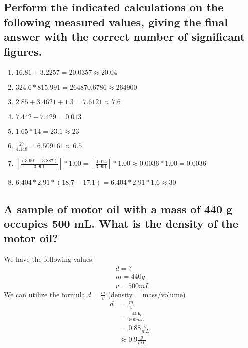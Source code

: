 \documentclass[11pt]{article}
\begin{document}
\subsection{Perform the indicated calculations on the following measured values, giving the final answer with the correct number of significant figures.}
\label{sec:org532b66f}
\begin{enumerate}
\item \(16.81 + 3.2257 = 20.0357 \approx 20.04\)
\item \(324.6 * 815.991 = 264870.6786 \approx 264900\)
\item \(2.85 + 3.4621 + 1.3 = 7.6121 \approx 7.6\)
\item \(7.442 - 7.429 = 0.013\)
\item \(1.65 * 14 = 23.1 \approx 23\)
\item \(\frac{27}{4.148} = 6.509161 \approx 6.5\)
\item \([\frac{(3.901 - 3.887)}{3.901}] * 1.00 = [\frac{0.014}{3.901}] * 1.00 \approx 0.0036 * 1.00 = 0.0036\)
\item \(6.404 * 2.91 * (18.7 - 17.1) = 6.404 * 2.91 * 1.6 \approx 30\)
\end{enumerate}

\subsection{A sample of motor oil with a mass of 440 g occupies 500 mL. What is the density of the motor oil?}
\label{sec:orgaeeb1cc}
We have the following values:
\begin{align*}
&d = ?\\
&m = 440g\\
&v = 500mL
\end{align*}
We can utilize the formula \(d=\frac{m}{v}\) (density = mass/volume)
\begin{align*}
d&=\frac{m}{v}\\
&=\frac{440g}{500mL}\\
&=0.88\frac{g}{mL}\\
&\approx0.9\frac{g}{mL}
\end{align*}
\end{document}
